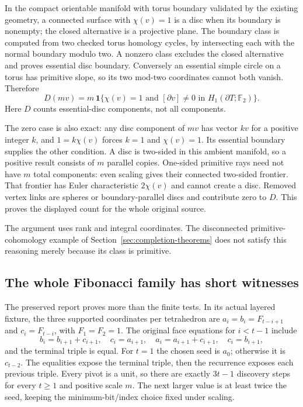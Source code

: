 In the compact orientable manifold with torus boundary validated by the
existing geometry, a connected surface with $\chi(v)=1$ is a disc when
its boundary is nonempty; the closed alternative is a projective plane.
The boundary class is computed from two checked torus homology cycles,
by intersecting each with the normal boundary modulo two. A nonzero class
excludes the closed alternative and proves essential disc boundary. Conversely
an essential simple circle on a torus has primitive slope, so its two
mod-two coordinates cannot both vanish. Therefore
\[
 D(mv)=m\,\mathbf1\{\chi(v)=1\text{ and }[\partial v]\ne0
                       \text{ in }H_1(\partial T;\mathbb F_2)\}.
\]
Here $D$ counts essential-disc components, not all components.

The zero case is also exact: any disc component of $mv$ has vector $kv$
for a positive integer $k$, and $1=k\chi(v)$ forces $k=1$ and
$\chi(v)=1$. Its essential boundary supplies the other condition. A disc
is two-sided in this ambient manifold, so a positive result consists of
$m$ parallel copies. One-sided primitive rays need not have $m$ total
components: even scaling gives their connected two-sided frontier. That
frontier has Euler characteristic $2\chi(v)$ and cannot create a disc.
Removed vertex links are spheres or boundary-parallel discs and contribute
zero to $D$. This proves the displayed count for the whole original source.

The argument uses rank and integral coordinates. The disconnected
primitive-cohomology example of Section~\ref{sec:completion-theorems} does
not satisfy this reasoning merely because its class is primitive.

\subsection{The whole Fibonacci family has short witnesses}

The preserved report proves more than the finite tests. In its actual
layered fixture, the three supported coordinates per tetrahedron are
$a_i=b_i=F_{t-i+1}$ and $c_i=F_{t-i}$, with $F_1=F_2=1$.
The original face equations for $i<t-1$ include
\[
 b_i=b_{i+1}+c_{i+1},\quad c_i=a_{i+1},\quad
 a_i=a_{i+1}+c_{i+1},\quad c_i=b_{i+1},
\]
and the terminal triple is equal. For $t=1$ the chosen seed is $a_0$;
otherwise it is $c_{t-2}$. The equalities expose the terminal triple,
then the recurrence exposes each previous triple. Every pivot is a unit,
so there are exactly $3t-1$ discovery steps for every $t\ge1$ and positive
scale $m$. The next larger value is at least twice the seed, keeping the
minimum-bit/index choice fixed under scaling.

